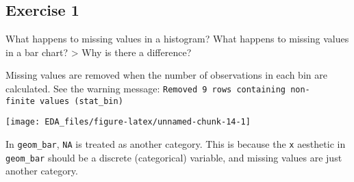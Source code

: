 \documentclass[]{book}
\newenvironment{Shaded}{\begin{snugshade}}{\end{snugshade}}
\newcommand{\CommentTok}[1]{\textcolor[rgb]{0.56,0.35,0.01}{\textit{#1}}}
\newcommand{\DataTypeTok}[1]{\textcolor[rgb]{0.13,0.29,0.53}{#1}}
\newcommand{\DecValTok}[1]{\textcolor[rgb]{0.00,0.00,0.81}{#1}}
\newcommand{\FloatTok}[1]{\textcolor[rgb]{0.00,0.00,0.81}{#1}}
\newcommand{\KeywordTok}[1]{\textcolor[rgb]{0.13,0.29,0.53}{\textbf{#1}}}
\newcommand{\NormalTok}[1]{#1}
\newcommand{\OperatorTok}[1]{\textcolor[rgb]{0.81,0.36,0.00}{\textbf{#1}}}
\newcommand{\OtherTok}[1]{\textcolor[rgb]{0.56,0.35,0.01}{#1}}
\newcommand{\StringTok}[1]{\textcolor[rgb]{0.31,0.60,0.02}{#1}}
\theoremstyle{definition}
\theoremstyle{definition}
\theoremstyle{definition}
\theoremstyle{remark}
\begin{document}
\hypertarget{exercise-1-9}{%
\subsection{Exercise 1}\label{exercise-1-9}}

What happens to missing values in a histogram? What happens to missing
values in a bar chart? \textgreater{} Why is there a difference?

Missing values are removed when the number of observations in each bin
are calculated. See the warning message:
\texttt{Removed\ 9\ rows\ containing\ non-finite\ values\ (stat\_bin)}

\begin{Shaded}
\end{Shaded}

\begin{center}\texttt{[image: EDA\_files/figure-latex/unnamed-chunk-14-1]} \end{center}

In \texttt{geom\_bar}, \texttt{NA} is treated as another category. This
is because the \texttt{x} aesthetic in \texttt{geom\_bar} should be a
discrete (categorical) variable, and missing values are just another
category.

\begin{Shaded}
\end{Shaded}
\end{document}
